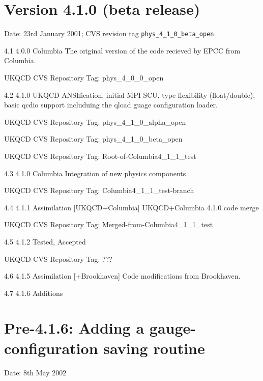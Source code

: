 \documentclass[12pt]{article}
\newcommand{\cde}[1]{{\tt #1}}            %
\begin{document}
\section{Version 4.1.0 (beta release)}
Date: 23rd January 2001; CVS revision tag \cde{phys\_4\_1\_0\_beta\_open}.

4.1  4.0.0 Columbia
The original version of the code recieved by EPCC from Columbia.

UKQCD CVS Repository Tag: phys\_4\_0\_0\_open

4.2  4.1.0 UKQCD
ANSIfication, initial MPI SCU, type flexibility (float/double), basic qcdio support includuing the qload guage configuration loader.

UKQCD CVS Repository Tag: phys\_4\_1\_0\_alpha\_open

UKQCD CVS Repository Tag: phys\_4\_1\_0\_beta\_open

UKQCD CVS Repository Tag: Root-of-Columbia4\_1\_1\_test

4.3  4.1.0 Columbia
Integration of new physics components

UKQCD CVS Repository Tag: Columbia4\_1\_1\_test-branch

4.4  4.1.1 Assimilation [UKQCD+Columbia]
UKQCD+Columbia 4.1.0 code merge

UKQCD CVS Repository Tag: Merged-from-Columbia4\_1\_1\_test

4.5  4.1.2 Tested, Accepted

UKQCD CVS Repository Tag: ???

4.6  4.1.5 Assimilation [+Brookhaven]
Code modifications from Brookhaven.

4.7  4.1.6 Additions

\section{Pre-4.1.6: Adding a gauge-configuration saving routine}
Date: 8th May 2002
\end{document}
